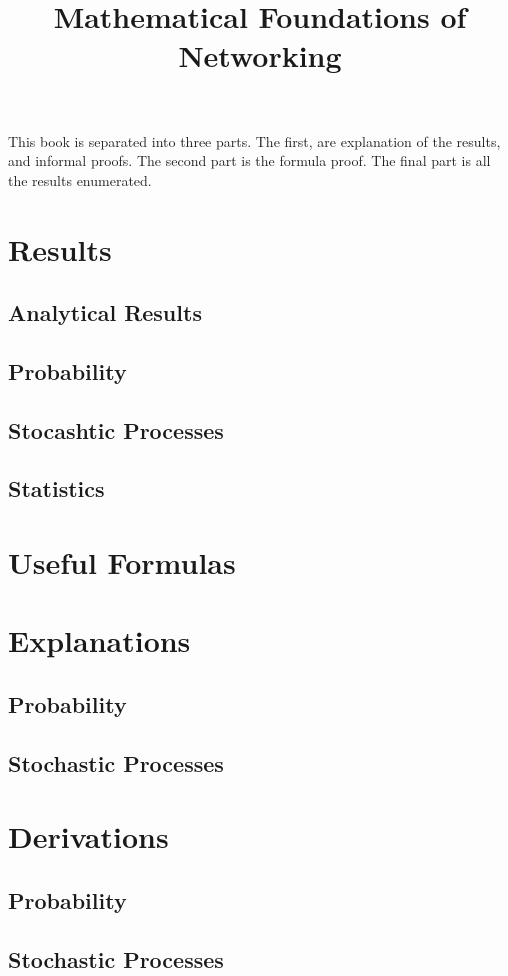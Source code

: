 \documentclass[letterpaper,12pt]{article}
\title{Mathematical Foundations of Networking}
\begin{document}
\raggedright

\setlength{\columnseprule}{0.5pt}
\setcounter{tocdepth}{4}
\setcounter{secnumdepth}{6}
\tableofcontents

This book is separated into three parts. The first, are explanation of the
results, and informal proofs. The second part is the formula proof. The final
part is all the results enumerated.


\newpage
\newlength{\tmpparskip}
\setlength{\tmpparskip}{\parskip}
\setlength{\parskip}{-3mm}
\section{Results}
\subsection{Analytical Results}

\subsection{Probability}

\subsection{Stocashtic Processes}

\subsection{Statistics}


\newpage
\section{Useful Formulas}


\newpage
\setlength{\parskip}{\tmpparskip}
\section{Explanations}
\subsection{Probability}


\newpage
\subsection{Stochastic Processes}


\newpage
\section{Derivations}
\subsection{Probability}

\subsection{Stochastic Processes}

\end{document}
